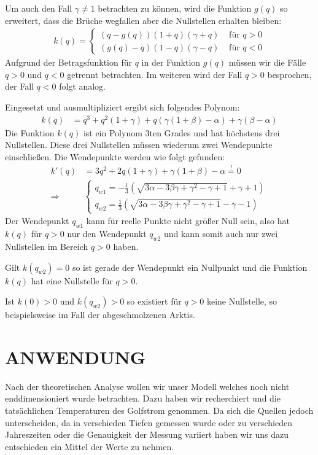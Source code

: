 \documentclass[a4paper,twoside]{article}
\begin{document}
	
	Um auch den Fall \(\gamma \neq 1\) betrachten zu können, wird die Funktion \(g(q)\) so erweitert, dass die Brüche wegfallen aber die Nullstellen erhalten bleiben:
	\begin{align*}
		k(q) = \left\{ \begin{array}{ll}
			\left( q - g\left(q\right) \right)(1 + q)(\gamma + q) &\textrm{ für } q > 0  \\
			\left( g\left(q\right) - q \right)(1 - q)(\gamma - q) &\textrm{ für } q < 0
		\end{array} \right.
	\end{align*}
	Aufgrund der Betragsfunktion für \(q\) in der Funktion \(g(q)\) müssen wir die Fälle \(q > 0\) und \(q < 0\) getrennt betrachten. Im weiteren wird der Fall \(q > 0\) besprochen, der Fall \(q < 0\) folgt analog.
	
	Eingesetzt und ausmultipliziert ergibt sich folgendes Polynom:
	\begin{align*}
		k(q) &= q^3 + q^2(1 + \gamma) + q\left(\gamma \left(1 + \beta\right) - \alpha \right) + \gamma \left( \beta - \alpha \right)
	\end{align*}
	Die Funktion \(k(q)\) ist ein Polynom 3ten Grades und hat höchstens drei Nullstellen. Diese drei Nullstellen müssen wiederum zwei Wendepunkte einschließen. Die Wendepunkte werden wie folgt gefunden:
	\begin{align*}
		k'(q) &= 3q^2 + 2q(1+\gamma) + \gamma(1+\beta) - \alpha \stackrel{!}{=} 0 \\
		\Rightarrow& \left\{ \begin{array}{l}
			q_{w1} = -\frac{1}{3}\left( \sqrt{3\alpha - 3\beta\gamma + \gamma^2 - \gamma + 1} +\gamma + 1 \right) \\
			q_{w2} = \frac{1}{3}\left( \sqrt{3\alpha - 3\beta\gamma + \gamma^2 - \gamma + 1} -\gamma - 1 \right)
		\end{array} \right.
	\end{align*}
	Der Wendepunkt \(q_{w1}\) kann für reelle Punkte nicht größer Null sein, also hat \(k(q)\) für \(q > 0\) nur den Wendepunkt \(q_{w2}\) und kann somit auch nur zwei Nullstellen im Bereich \(q > 0\) haben.
	
	Gilt \(k(q_{w2}) = 0\) so ist gerade der Wendepunkt ein Nullpunkt und die Funktion \(k(q)\) hat eine Nullstelle für \(q > 0\).
	
	Ist \(k(0) > 0\) und \(k(q_{w2}) > 0\) so existiert für \(q > 0\) keine Nullstelle, so beispielsweise im Fall der abgeschmolzenen Arktis.
	
	
	\section{\uppercase{Anwendung}}\label{sec:Anwendung}
	\noindent Nach der theoretischen Analyse wollen wir unser Modell welches noch nicht enddimensioniert wurde betrachten. Dazu haben wir recherchiert und die tatsächlichen Temperaturen des Golfstrom genommen. Da sich die Quellen jedoch unterscheiden, da in verschieden Tiefen gemessen wurde oder zu verschieden Jahreszeiten oder die Genauigkeit der Messung variiert haben wir uns dazu entschieden ein Mittel der Werte zu nehmen.
	
\end{document}
